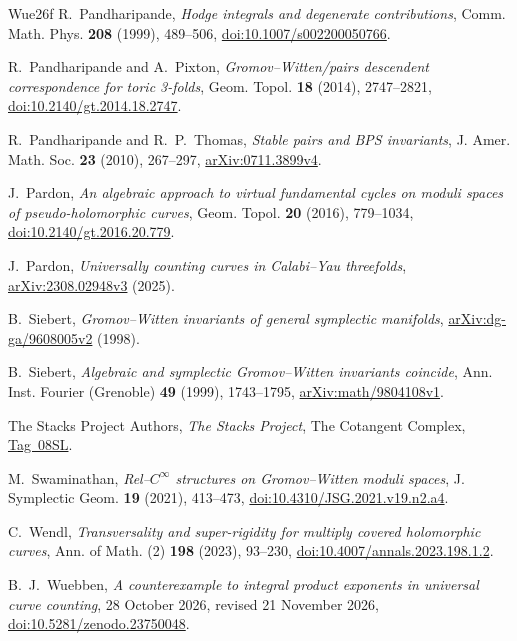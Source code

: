 \begin{thebibliography}{Wue26f}
 R.~Pandharipande,
\emph{Hodge integrals and degenerate contributions},
Comm. Math. Phys. \textbf{208} (1999), 489--506,
\href{https://doi.org/10.1007/s002200050766}{doi:10.1007/s002200050766}.

 R.~Pandharipande and A.~Pixton,
\emph{Gromov--Witten/pairs descendent correspondence for toric 3-folds},
Geom. Topol. \textbf{18} (2014), 2747--2821,
\href{https://doi.org/10.2140/gt.2014.18.2747}{doi:10.2140/gt.2014.18.2747}.

 R.~Pandharipande and R.~P.~Thomas,
\emph{Stable pairs and BPS invariants}, J. Amer. Math. Soc.
\textbf{23} (2010), 267--297,
\href{https://arxiv.org/abs/0711.3899v4}{arXiv:0711.3899v4}.

 J.~Pardon,
\emph{An algebraic approach to virtual fundamental cycles on moduli spaces
of pseudo-holomorphic curves}, Geom. Topol. \textbf{20} (2016), 779--1034,
\href{https://doi.org/10.2140/gt.2016.20.779}{doi:10.2140/gt.2016.20.779}.

 J.~Pardon,
\emph{Universally counting curves in Calabi--Yau threefolds},
\href{https://arxiv.org/abs/2308.02948v3}{arXiv:2308.02948v3} (2025).

 B.~Siebert,
\emph{Gromov--Witten invariants of general symplectic manifolds},
\href{https://arxiv.org/abs/dg-ga/9608005v2}{arXiv:dg-ga/9608005v2} (1998).

 B.~Siebert,
\emph{Algebraic and symplectic Gromov--Witten invariants coincide},
Ann. Inst. Fourier (Grenoble) \textbf{49} (1999), 1743--1795,
\href{https://arxiv.org/abs/math/9804108v1}{arXiv:math/9804108v1}.

 The Stacks Project Authors,
\emph{The Stacks Project}, The Cotangent Complex,
\href{https://stacks.math.columbia.edu/tag/08SL}{Tag~08SL}.

 M.~Swaminathan,
\emph{Rel--$C^\infty$ structures on Gromov--Witten moduli spaces},
J. Symplectic Geom. \textbf{19} (2021), 413--473,
\href{https://doi.org/10.4310/JSG.2021.v19.n2.a4}{doi:10.4310/JSG.2021.v19.n2.a4}.

 C.~Wendl,
\emph{Transversality and super-rigidity for multiply covered holomorphic curves},
Ann. of Math. (2) \textbf{198} (2023), 93--230,
\href{https://doi.org/10.4007/annals.2023.198.1.2}{doi:10.4007/annals.2023.198.1.2}.

 B.~J.~Wuebben,
\emph{A counterexample to integral product exponents in universal curve counting}, 28 October 2026, revised 21 November 2026,
\href{https://doi.org/10.5281/zenodo.23750048}{doi:10.5281/zenodo.23750048}.


\end{thebibliography}
